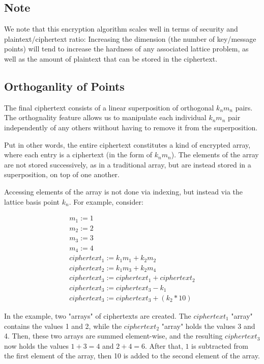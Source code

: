 \documentclass[preprint]{iacrtrans}
\begin{document}
\subsection{Note}
We note that this encryption algorithm scales well in terms of security and plaintext/ciphertext ratio: Increasing the dimension (the number of key/message points) will tend to increase the hardness of any associated lattice problem, as well as the amount of plaintext that can be stored in the ciphertext. 

\subsection{Orthoganlity of Points}
The final ciphertext consists of a linear superposition of orthogonal $k_n m_n$ pairs. The orthognality feature allows us to manipulate each individual $k_n m_n$ pair independently of any others wiithout having to remove it from the superposition.

 Put in other words, the entire ciphertext constitutes a kind of encrypted array, where each entry is a ciphertext (in the form of $k_n m_n$). The elements of the array are not stored successively, as in a traditional array, but are instead stored in a superposition, on top of one another. 

Accessing elements of the array is not done via indexing, but instead via the lattice basis point $k_n$. For example, consider:

\begin{align}
m_1 := 1\\
m_2 := 2\\
m_3 := 3\\
m_4 := 4\\
ciphertext_1 := k_1 m_1 + k_2 m_2\\
ciphertext_2 := k_1 m_3 + k_2 m_4\\
ciphertext_3 := ciphertext_1 + ciphertext_2\\
ciphertext_3 := ciphertext_3 - k_1\\
ciphertext_3 := ciphertext_3 + ( k_2 * 10)
\end{align}

In the example, two "arrays" of ciphertexts are created. The $ciphertext_1$ "array" contains the values 1 and 2, while the $ciphertext_2$ "array" holds the values 3 and 4. Then, these two arrays are summed element-wise, and the resulting $ciphertext_3$ now holds the values $1 + 3 = 4$ and $2 + 4 = 6$. After that, $1$ is subtracted from the first element of the array, then 10 is added to the second element of the array.
\end{document}
